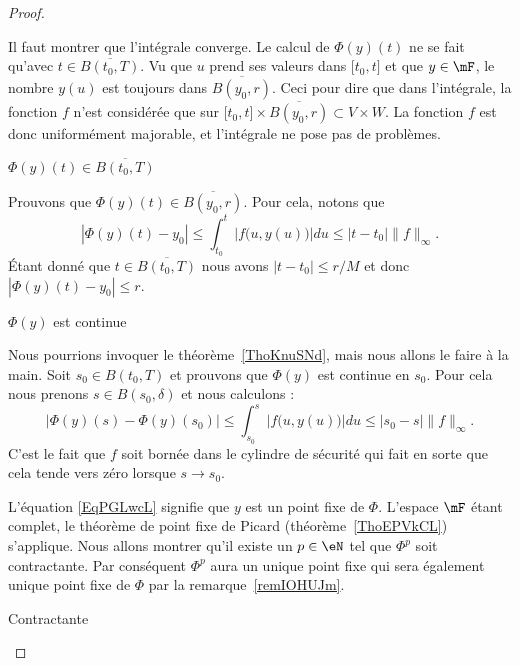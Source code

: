 \begin{proof}
\begin{subproof}
\begin{subproof}
			Il faut montrer que l'intégrale converge. Le calcul de \( \Phi(y)(t)\) ne se fait qu'avec \( t\in \overline{ B(t_0,T) }\). Vu que \( u\) prend ses valeurs dans \( \mathopen[ t_0 , t \mathclose]\) et que \( y\in\mF\), le nombre \( y(u)\) est toujours dans \( \overline{ B(y_0,r) }\). Ceci pour dire que dans l'intégrale, la fonction \( f\) n'est considérée que sur \( \mathopen[ t_0 , t \mathclose]\times \overline{ B(y_0,r) }\subset V\times W\). La fonction \( f\) est donc uniformément majorable, et l'intégrale ne pose pas de problèmes.

			\item[\( \Phi(y)(t)\in \overline{ B(t_0,T) }\)]

			Prouvons que \( \Phi(y)(t)\in\overline{ B(y_0,r) }\). Pour cela, notons que
			\begin{equation}
				| \Phi(y)(t)-y_0 |\leq \int_{t_0}^t |f\big( u,y(u) \big)|du\leq | t-t_0 |\| f \|_{\infty}.
			\end{equation}
			Étant donné que \( t\in\overline{ B(t_0,T) }\) nous avons \( | t-t_0 |\leq r/M\) et donc \( | \Phi(y)(t)-y_0 |\leq r\).

			\item[\( \Phi(y)\) est continue]

			Nous pourrions invoquer le théorème~\ref{ThoKnuSNd}, mais nous allons le faire à la main. Soit \( s_0\in B(t_0,T)\) et prouvons que \( \Phi(y)\) est continue en \( s_0\). Pour cela nous prenons \( s\in B(s_0,\delta)\) et nous calculons :
			\begin{equation}
				| \Phi(y)(s)-\Phi(y)(s_0) |\leq \int_{s_0}^s|f\big( u,y(u) \big)|du\leq | s_0-s |\| f \|_{\infty}.
			\end{equation}
			C'est le fait que \( f\) soit bornée dans le cylindre de sécurité qui fait en sorte que cela tende vers zéro lorsque \( s\to s_0\).
		\end{subproof}

		L'équation \eqref{EqPGLwcL} signifie que \( y\) est un point fixe de \( \Phi\). L'espace \( \mF\) étant complet, le théorème de point fixe de Picard (théorème~\ref{ThoEPVkCL}) s'applique. Nous allons montrer qu'il existe un \( p\in\eN\) tel que \( \Phi^p\) soit contractante. Par conséquent \( \Phi^p\) aura un unique point fixe qui sera également unique point fixe de \( \Phi\) par la remarque~\ref{remIOHUJm}.

		\item[Contractante]


\end{subproof}
\end{proof}
